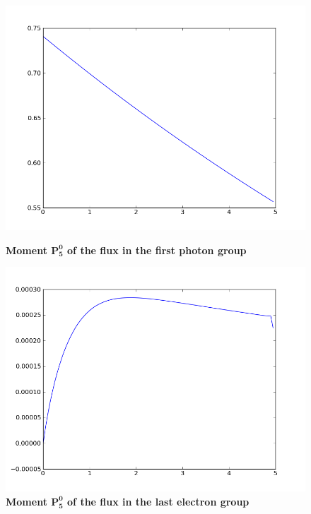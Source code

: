 \begin{figure}[H]
\begin{minipage}[b]{0.42\linewidth}
\centering
\includegraphics[width=\linewidth]{./images/al/group_0_moment_30}
\caption{\bf{Moment $\mathbf{P_5^0}$ of the flux in the first photon group}}
\label{test3}
\end{minipage}
\hspace{0.5cm}
\begin{minipage}[b]{0.42\linewidth}
\centering
\includegraphics[width=\linewidth]{./images/al/group_39_moment_30}
\caption{\bf{Moment $\mathbf{P_5^0}$ of the flux in the last electron group}}
\label{test4}
\end{minipage}
\end{figure}

